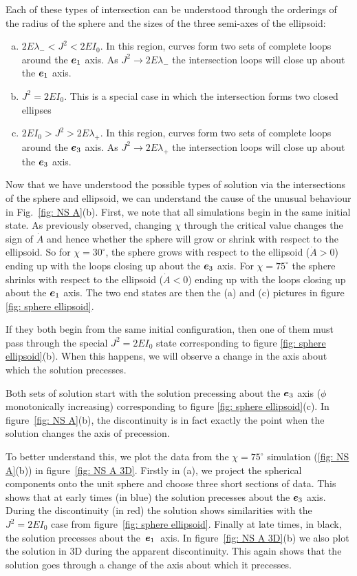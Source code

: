 \documentclass[../full_thesis/full_thesis.tex]{subfiles}
\begin{document}
Each of these types of intersection can be understood through the orderings of
the radius of the sphere and the sizes of the three semi-axes of the ellipsoid:
\begin{enumerate}[(a)]
\item $2E\lambda_{-}<J^{2}<2EI_{0}$. In this region, curves form two sets of
    complete loops around the $\boldsymbol{e}_{1}$ axis. As $J^{2} \rightarrow 2E\lambda_{-}$
    the intersection loops will close up about the $\boldsymbol{e}_{1}$ axis.
\item $J^{2} = 2EI_{0}$. This is a special case in which the intersection forms two
    closed ellipses
\item $2EI_{0}>J^{2}>2E\lambda_{+}$. In this region, curves form two sets of
    complete loops around the $\boldsymbol{e}_{3}$ axis. As $J^{2} \rightarrow 2E\lambda_{+}$
    the intersection loops will close up about the $\boldsymbol{e}_{3}$ axis.
\end{enumerate}

Now that we have understood the possible types of solution via the intersections
of the sphere and ellipsoid, we can understand the cause of the unusual behaviour
in Fig.~\eqref{fig: NS A}(b). First, we note that
all simulations begin in the same initial state. As previously observed,
changing $\chi$ through the critical value changes the sign of $\dot{A}$ and
hence whether the sphere will grow or shrink with respect to the ellipsoid. So
for $\chi=30^{\circ}$, the sphere grows with respect to the ellipsoid
($\dot{A}>0$) ending up with the loops closing up about the $\boldsymbol{e}_{3}$ axis. For
$\chi=75^{\circ}$ the sphere shrinks with respect to the ellipsoid
($\dot{A}<0$) ending up with the loops closing up about the $\boldsymbol{e}_{1}$ axis. The two
end states are then the (a) and (c) pictures in figure \ref{fig: sphere ellipsoid}.

If they both begin from the same initial configuration, then one of them must pass through
the special $J^{2}=2EI_{0}$ state corresponding to figure \ref{fig: sphere ellipsoid}(b).
When this happens, we will observe a change in the axis about which the solution
precesses.

Both sets of solution start with the solution precessing about the $\boldsymbol{e}_{3}$ axis
($\phi$ monotonically increasing) corresponding to figure \ref{fig: sphere ellipsoid}(c).
In figure~\ref{fig: NS A}(b), the discontinuity is in fact exactly the point
when the solution changes the axis of precession.

To better understand this, we plot the data from the
$\chi=75^{\circ}$ simulation (\ref{fig: NS A}(b)) in figure~\ref{fig: NS A 3D}. Firstly in (a),
we project the spherical components onto the unit sphere and choose three
short sections of data. This shows that at early times (in blue) the solution
precesses about the $\boldsymbol{e}_{3}$ axis. During the discontinuity (in red) the solution
shows similarities with the $J^{2}=2EI_{0}$ case from figure~\ref{fig: sphere
ellipsoid}. Finally at late times, in black, the solution precesses about
the~$\boldsymbol{e}_{1}$~axis. In figure~\ref{fig: NS A 3D}(b) we also plot the solution in
3D during the apparent discontinuity. This again shows that the solution goes
through a change of the axis about which it precesses.
\end{document}
